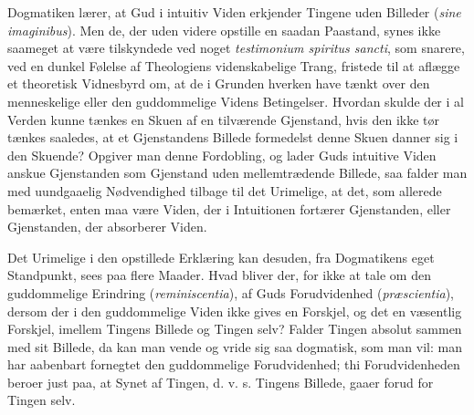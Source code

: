 \documentclass[11pt]{book}
\begin{document}
Dogmatiken lærer, at Gud i intuitiv Viden erkjender Tingene uden
Billeder (\textit{sine imaginibus}). Men de, der uden videre opstille en
saadan Paastand, synes ikke saameget at være tilskyndede ved noget
\textit{testimonium spiritus sancti}, som snarere, ved en dunkel Følelse
af Theologiens videnskabelige Trang, fristede til at aflægge et
theoretisk Vidnesbyrd om, at de i Grunden hverken have tænkt over den
menneskelige eller den guddommelige Videns Betingelser. Hvordan skulde
der i al Verden kunne tænkes en Skuen af en tilværende Gjenstand, hvis
den ikke tør tænkes saaledes, at et Gjenstandens Billede formedelst
denne Skuen danner sig i den Skuende? Opgiver man denne Fordobling, og
lader Guds intuitive Viden anskue Gjenstanden som Gjenstand uden
mellemtrædende Billede, saa falder man med uundgaaelig Nødvendighed
tilbage til det Urimelige, at det, som allerede bemærket, enten maa være
Viden, der i Intuitionen fortærer Gjenstanden, eller Gjenstanden, der
absorberer Viden.

Det Urimelige i den opstillede Erklæring kan desuden, fra Dogmatikens
eget Standpunkt, sees paa flere Maader. Hvad bliver der, for ikke at
tale om den guddommelige Erindring (\textit{reminiscentia}), af Guds
Forudvidenhed (\textit{præscientia}), dersom der i den guddommelige
Viden ikke gives en Forskjel, og det en væsentlig Forskjel, imellem
Tingens Billede og Tingen selv? Falder Tingen absolut sammen med sit
Billede, da kan man vende og vride sig saa dogmatisk, som man vil: man
har aabenbart fornegtet den guddommelige Forudvidenhed; thi
Forudvidenheden beroer just paa, at Synet af Tingen, d. v. s. Tingens
Billede, gaaer forud for Tingen selv.
\end{document}

